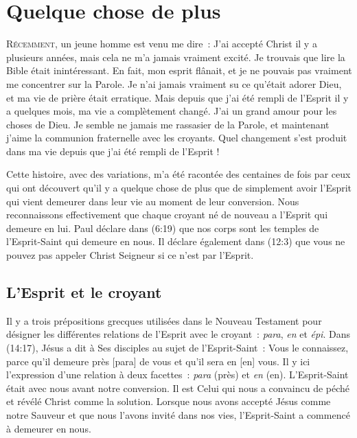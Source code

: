 \chapter{Quelque chose de plus}

\lettrine{R}{écemment}, un jeune homme est venu me dire~:
 \og J'ai accepté Christ il y a plusieurs années,
 mais cela ne m'a jamais vraiment excité.
 Je trouvais que lire la Bible était inintéressant.
 En fait, mon esprit flânait, et je ne pouvais pas vraiment me concentrer
 sur la Parole. Je n'ai jamais vraiment su ce qu'était adorer Dieu,
 et ma vie de prière était erratique. Mais depuis que j'ai été rempli
 de l'Esprit il y a quelques mois, ma vie a complètement changé.
 J'ai un grand amour pour les choses de Dieu.
 Je semble ne jamais me rassasier de la Parole, et maintenant j'aime
 la communion fraternelle avec les croyants.
 Quel changement s'est produit dans ma vie depuis que j'ai été rempli
 de l'Esprit ! \fg{}

Cette histoire, avec des variations, m'a été racontée des centaines de fois
 par ceux qui ont découvert qu'il y a quelque chose de plus que de simplement
 avoir l'Esprit qui vient demeurer dans leur vie au moment de leur conversion.
 Nous reconnaissons effectivement que chaque croyant né de nouveau a l'Esprit
 qui demeure en lui. Paul déclare dans (6:19) que nos corps
 sont les temples de l'Esprit-Saint qui demeure en nous.
 Il déclare également dans (12:3) que vous ne pouvez pas
 appeler Christ Seigneur si ce n'est par l'Esprit.


\section*{L'Esprit et le croyant}

Il y a trois prépositions grecques utilisées dans le Nouveau Testament
 pour désigner les différentes relations de l'Esprit avec le croyant~:
 \emph{para}, \emph{en} et \emph{épi}.
 Dans (14:17), Jésus a dit à Ses disciples au sujet de
 l'Esprit-Saint~: \og Vous le connaissez, parce qu'il demeure près [para]
 de vous et qu'il sera en [en] vous. \fg{}
 Il y ici l'expression d'une relation à deux facettes~:
 \emph{para} (près) et \emph{en} (en).
 L'Esprit-Saint était avec nous avant notre conversion.
 Il est Celui qui nous a convaincu de péché et révélé Christ
 comme la solution. Lorsque nous avons accepté Jésus comme notre Sauveur
 et que nous l'avons invité dans nos vies, l'Esprit-Saint
 a commencé à demeurer en nous.

